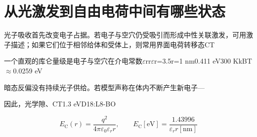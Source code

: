\documentclass[11pt,a4paper]{article}
\begin{document}
\section{{\cjkfont 从光激发到自由电荷中间有哪些状态}\allowbreak{}}\label{sec:6}
{\cjkfont 光子吸收首先改变电子占据。若电子与空穴仍受吸引而形成中性关联激发，可用激子描述；如果它们位于相邻给体和受体上，则常用界面电荷转移态}\allowbreak{}CT\allowbreak{}
\par
{\cjkfont 一个直观的库仑量级是电子与空穴在介电常数}\allowbreak{}\ensuremath{\varepsilon}r\allowbreak{}r\allowbreak{}\ensuremath{\varepsilon}r=\allowbreak{}3.5\allowbreak{}r=\allowbreak{}1 nm\allowbreak{}0.411 eV\allowbreak{}300 K\allowbreak{}kBT\ensuremath{\approx}\allowbreak{}0.0259 eV\allowbreak{}
\par
{\cjkfont 暗态反偏没有持续光子供给。若模型声称在体内不断产生新电子}\allowbreak{}—\allowbreak{}
\par
{\cjkfont 因此，光学隙、}\allowbreak{}CT\allowbreak{}1.3 eV\allowbreak{}D18:L8-BO\allowbreak{}
\par
\begin{equation}
E_{\mathrm{C}}(r)=\frac{q^2}{4\pi\varepsilon_0\varepsilon_r r},\qquad E_{\mathrm{C}}[\mathrm{eV}]=\frac{1.43996}{\varepsilon_r r[\mathrm{nm}]}
\label{eq:1}\end{equation}
\end{document}
